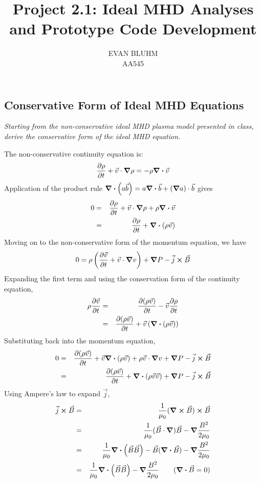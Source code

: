 \documentclass[10pt,letterpaper,notitlepage]{report}
\title{Project 2.1: Ideal MHD Analyses and Prototype Code Development}
\author{EVAN BLUHM \\ AA545}
\date{}
\begin{document}
\maketitle

\subsection*{Conservative Form of Ideal MHD Equations}

\emph{Starting from the non-conservative ideal MHD plasma model presented in class, derive the conservative form of the ideal MHD equation.}

\vspace{10pt}

The non-conservative continuity equation is:
\begin{equation}
\pdv{\rho}{t} + \vec v \cdot \grad \rho = - \rho \div \vec v
\end{equation}
Application of the product rule $\div (a \vec b) = a \div \vec b + (\grad a) \cdot \vec b$ gives
\begin{eqnarray}
0 & = & \pdv{\rho}{t} + \vec v \cdot \grad \rho + \rho \div \vec v \\
& = & \pdv{\rho}{t} + \div (\rho \vec v)
\end{eqnarray}
Moving on to the non-conservative form of the momentum equation, we have
\begin{equation}
0 = \rho \left( \pdv{\vec v}{t} + \vec v \cdot \grad v \right) + \grad P - \vec j \cross \vec B
\end{equation}
Expanding the first term and using the conservation form of the continuity equation,
\begin{eqnarray}
\rho \pdv{\vec v}{t} & = & \pdv{(\rho \vec v)}{t} - \vec v \pdv{\rho}{t} \\
& = & \pdv{(\rho \vec v)}{t} + \vec v \left( \div (\rho \vec v) \right)
\end{eqnarray}
Substituting back into the momentum equation,
\begin{eqnarray}
0 & = & \pdv{(\rho \vec v)}{t} + \vec v \div (\rho \vec v) + \rho \vec v \cdot \grad v + \grad P - \vec j \cross \vec B \\
& = & \pdv{(\rho \vec v)}{t} + \div (\rho \vec v \vec v) + \grad P - \vec j \cross \vec B
\end{eqnarray}
Using Ampere's law to expand $\vec j$,
\begin{eqnarray}
\vec j \cross \vec B & = & \frac{1}{\mu_0} (\curl \vec B) \cross \vec B \\
& = & \frac{1}{\mu_0} (\vec B \cdot \grad) \vec B -  \grad \frac{B^2}{2 \mu_0} \\
& = & \frac{1}{\mu_0} \div (\vec B \vec B) - \vec B (\div \vec B) - \grad \frac{B^2}{2 \mu_0} \\
& = & \frac{1}{\mu_0} \div (\vec B \vec B) - \grad \frac{B^2}{2 \mu_0} \qquad (\div \vec B = 0)
\end{eqnarray}
\end{document}
